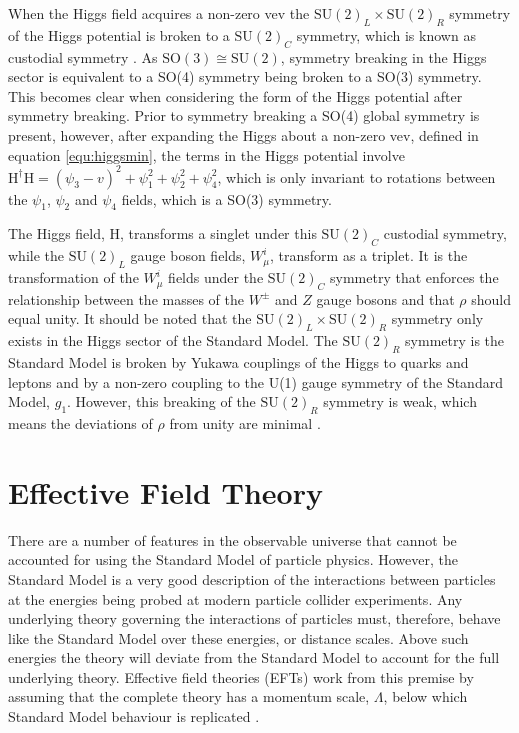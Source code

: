 When the Higgs field acquires a non-zero vev the $\text{SU}(2)_{L} \times \text{SU}(2)_{R}$ symmetry of the Higgs potential is broken to a $\text{SU}(2)_{C}$ symmetry, which is known as custodial symmetry \cite{Grojean:2007zz}.  As $\text{SO}(3) \cong \text{SU}(2)$, symmetry breaking in the Higgs sector is equivalent to a SO(4) symmetry being broken to a SO(3) symmetry.  This becomes clear when considering the form of the Higgs potential after symmetry breaking.  Prior to symmetry breaking a SO(4) global symmetry is present, however, after expanding the Higgs about a non-zero vev, defined in equation \ref{equ:higgsmin}, the terms in the Higgs potential involve $\text{H}^{\dagger}\text{H} = (\psi_{3}-v)^{2} + \psi_{1}^{2} + \psi_{2}^{2} + \psi_{4}^{2}$, which is only invariant to rotations between the $\psi_{1}$,  $\psi_{2}$ and $\psi_{4}$ fields, which is a SO(3) symmetry.

The Higgs field, H, transforms a singlet under this $\text{SU}(2)_{C}$ custodial symmetry, while the $\text{SU}(2)_{L}$ gauge boson fields, $W^{i}_{\mu}$, transform as a triplet.  It is the transformation of the $W^{i}_{\mu}$ fields under the $\text{SU}(2)_{C}$ symmetry that enforces the relationship between the masses of the $W^{\pm}$ and $Z$ gauge bosons and that $\rho$ should equal unity.  It should be noted that the $\text{SU}(2)_{L} \times \text{SU}(2)_{R}$ symmetry only exists in the Higgs sector of the Standard Model.  The $\text{SU}(2)_{R}$ symmetry is the Standard Model is broken by Yukawa couplings of the Higgs to quarks and leptons and by a non-zero coupling to the U(1) gauge symmetry of the Standard Model, $g_{1}$.  However, this breaking of the $\text{SU}(2)_{R}$ symmetry is weak, which means the deviations of $\rho$ from unity are minimal \cite{Grojean:2007zz}.  


\section{Effective Field Theory}
\label{sec:eft}
There are a number of features in the observable universe that cannot be accounted for using the Standard Model of particle physics.  However, the Standard Model is a very good description of the interactions between particles at the energies being probed at modern particle collider experiments.  Any underlying theory governing the interactions of particles must, therefore, behave like the Standard Model over these energies, or distance scales.  Above such energies the theory will deviate from the Standard Model to account for the full underlying theory.  Effective field theories (EFTs) work from this premise by assuming that the complete theory has a momentum scale, $\Lambda$, below which Standard Model behaviour is replicated \cite{Degrande:2013rea, Arzt:1993gz}.  

